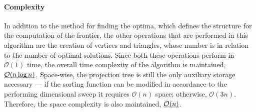 



\paragraph{Complexity} In addition to the method for finding the optima, which defines the structure for the computation of the frontier, the other operations that are performed in this algorithm are the creation of vertices and triangles, whose number is in relation to the number of optimal solutions. Since both these operations perform in $\mathcal{O}(1)$ time, the overall time complexity of the algorithm is maintained, $\underline{\smash{\mathcal{O}(n\log n)}}$. Space-wise, the projection tree is still the only auxiliary storage necessary --- if the sorting function can be modified in accordance to the performing dimensional sweep it requires $\mathcal{O}(n)$ space; otherwise, $\mathcal{O}(3n)$. Therefore, the space complexity is also maintained, $\underline{\smash{\mathcal{O}(n)}}$.